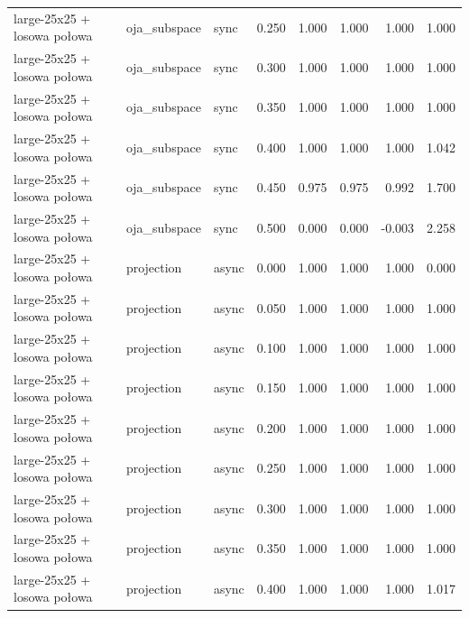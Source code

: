 \begin{tabular}{lllrrrrr}
large-25x25 + losowa połowa & oja\_subspace & sync & 0.250 & 1.000 & 1.000 & 1.000 & 1.000 \\

large-25x25 + losowa połowa & oja\_subspace & sync & 0.300 & 1.000 & 1.000 & 1.000 & 1.000 \\

large-25x25 + losowa połowa & oja\_subspace & sync & 0.350 & 1.000 & 1.000 & 1.000 & 1.000 \\

large-25x25 + losowa połowa & oja\_subspace & sync & 0.400 & 1.000 & 1.000 & 1.000 & 1.042 \\

large-25x25 + losowa połowa & oja\_subspace & sync & 0.450 & 0.975 & 0.975 & 0.992 & 1.700 \\

large-25x25 + losowa połowa & oja\_subspace & sync & 0.500 & 0.000 & 0.000 & -0.003 & 2.258 \\

large-25x25 + losowa połowa & projection & async & 0.000 & 1.000 & 1.000 & 1.000 & 0.000 \\

large-25x25 + losowa połowa & projection & async & 0.050 & 1.000 & 1.000 & 1.000 & 1.000 \\

large-25x25 + losowa połowa & projection & async & 0.100 & 1.000 & 1.000 & 1.000 & 1.000 \\

large-25x25 + losowa połowa & projection & async & 0.150 & 1.000 & 1.000 & 1.000 & 1.000 \\

large-25x25 + losowa połowa & projection & async & 0.200 & 1.000 & 1.000 & 1.000 & 1.000 \\

large-25x25 + losowa połowa & projection & async & 0.250 & 1.000 & 1.000 & 1.000 & 1.000 \\

large-25x25 + losowa połowa & projection & async & 0.300 & 1.000 & 1.000 & 1.000 & 1.000 \\

large-25x25 + losowa połowa & projection & async & 0.350 & 1.000 & 1.000 & 1.000 & 1.000 \\

large-25x25 + losowa połowa & projection & async & 0.400 & 1.000 & 1.000 & 1.000 & 1.017 \\


\end{tabular}
